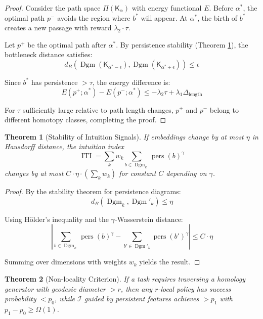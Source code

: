 \documentclass[11pt]{article}
\newtheorem{theorem}{Theorem}[section]
\DeclareMathOperator{\pers}{pers}
\DeclareMathOperator{\Dgm}{Dgm}
\DeclareMathOperator{\ITI}{ITI}
\begin{document}
\begin{proof}
Consider the path space $\Pi(\mathsf{K}_\alpha)$ with energy functional $E$. Before $\alpha^*$, the optimal path $p^-$ avoids the region where $b^*$ will appear. At $\alpha^*$, the birth of $b^*$ creates a new passage with reward $\lambda_2 \cdot \tau$.

Let $p^+$ be the optimal path after $\alpha^*$. By persistence stability (Theorem \ref{thm:stability}), the bottleneck distance satisfies:
$$d_B(\Dgm(\mathsf{K}_{\alpha^*-\epsilon}), \Dgm(\mathsf{K}_{\alpha^*+\epsilon})) \leq \epsilon$$

Since $b^*$ has persistence $>\tau$, the energy difference is:
$$E(p^+; \alpha^*) - E(p^-; \alpha^*) \leq -\lambda_2 \tau + \lambda_1 \Delta_{\text{length}}$$

For $\tau$ sufficiently large relative to path length changes, $p^+$ and $p^-$ belong to different homotopy classes, completing the proof.
\end{proof}

\begin{theorem}[Stability of Intuition Signals]
\label{thm:stability}
If embeddings change by at most $\eta$ in Hausdorff distance, the intuition index 
$$\ITI = \sum_k w_k \sum_{b\in\Dgm_k} \pers(b)^\gamma$$
changes by at most $C \cdot \eta \cdot (\sum_k w_k)$ for constant $C$ depending on $\gamma$.
\end{theorem}

\begin{proof}
By the stability theorem for persistence diagrams:
$$d_B(\Dgm_k, \Dgm'_k) \leq \eta$$

Using Hölder's inequality and the $\gamma$-Wasserstein distance:
$$\left| \sum_{b \in \Dgm_k} \pers(b)^\gamma - \sum_{b' \in \Dgm'_k} \pers(b')^\gamma \right| \leq C \cdot \eta$$

Summing over dimensions with weights $w_k$ yields the result.
\end{proof}

\begin{theorem}[Non-locality Criterion]
\label{thm:nonlocal}
If a task requires traversing a homology generator with geodesic diameter $>r$, then any $r$-local policy has success probability $< p_0$, while $\mathcal{I}$ guided by persistent features achieves $> p_1$ with $p_1 - p_0 \geq \Omega(1)$.
\end{theorem}
\end{document}
